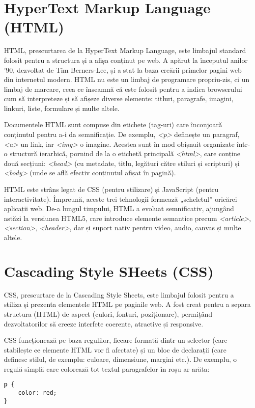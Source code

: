 \section{HyperText Markup Language (HTML)}

HTML, prescurtarea de la HyperText Markup Language, este limbajul standard folosit pentru a structura și
a afișa conținut pe web. A apărut la începutul anilor ’90, dezvoltat de Tim Berners-Lee, și a stat la baza
creării primelor pagini web din internetul modern. HTML nu este un limbaj de programare propriu-zis, ci un
limbaj de marcare, ceea ce înseamnă că este folosit pentru a indica browserului cum să interpreteze și să
afișeze diverse elemente: titluri, paragrafe, imagini, linkuri, liste, formulare și multe altele. \parencite{htmlcss}

Documentele HTML sunt compuse din etichete (tag-uri) care înconjoară conținutul pentru a-i da semnificație.
De exemplu, \textit{<p>} definește un paragraf, \textit{<a>} un link, iar \textit{<img>} o imagine. Acestea sunt în mod obișnuit
organizate într-o structură ierarhică, pornind de la o etichetă principală \textit{<html>}, care conține două secțiuni:
\textit{<head>} (cu metadate, titlu, legături către stiluri și scripturi) și \textit{<body>} (unde se află efectiv conținutul
afișat în pagină). \parencite{htmlcss}

HTML este strâns legat de CSS (pentru stilizare) și JavaScript (pentru interactivitate). Împreună, aceste trei
tehnologii formează „scheletul” oricărei aplicații web. De-a lungul timpului, HTML a evoluat semnificativ,
ajungând astăzi la versiunea HTML5, care introduce elemente semantice precum \textit{<article>}, \textit{<section>}, \textit{<header>},
dar și suport nativ pentru video, audio, canvas și multe altele. \parencite{htmlcss}

\section{Cascading Style SHeets (CSS)}

CSS, prescurtare de la Cascading Style Sheets, este limbajul folosit pentru a stiliza și prezenta elementele
HTML pe paginile web. A fost creat pentru a separa structura (HTML) de aspect (culori, fonturi, poziționare),
permițând dezvoltatorilor să creeze interfețe coerente, atractive și responsive. \parencite{htmlcss}

CSS funcționează pe baza regulilor, fiecare formată dintr-un selector (care stabilește ce elemente HTML vor
fi afectate) și un bloc de declarații (care definesc stilul, de exemplu: culoare, dimensiune, margini etc.).
De exemplu, o regulă simplă care colorează tot textul paragrafelor în roșu ar arăta:
\begin{verbatim}
p {
    color: red;
}  
\end{verbatim}

